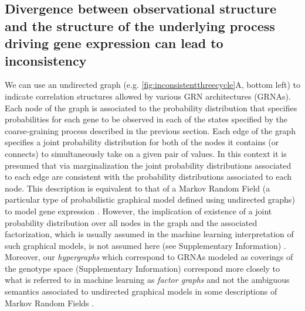 \subsection{Divergence between observational structure and the structure of the underlying process driving gene expression can lead to inconsistency}
We can use an undirected graph (e.g. \ref{fig:inconsistentthreecycle}A, bottom left) to indicate correlation structures allowed by various GRN architectures (GRNAs). Each node of the graph is associated to the probability distribution that specifies probabilities for each gene to be observed in each of the states specified by the coarse-graining process described in the previous section. Each edge of the graph specifies a joint probability distribution for both of the nodes it contains (or connects) to simultaneously take on a given pair of values. In this context it is presumed that via marginalization the joint probability distributions associated to each edge are consistent with the probability distributions associated to each node. This description is equivalent to that of a Markov Random Field (a particular type of probabilistic graphical model defined using undirected graphs) to model gene expression \cite{Chen2013a}. However, the implication of existence of a joint probability distribution over all nodes in the graph and the associated factorization, which is usually assumed in the machine learning interpretation of such graphical models, is not assumed here (see Supplementary Information) \cite{Barber2012,Bishop2007,Murphy2012,Koller2009}. Moreover, our \emph{hypergraphs} which correspond to GRNAs modeled as coverings of the genotype space (Supplementary Information) correspond more closely to what is referred to in machine learning as \emph{factor graphs} and not the ambiguous semantics associated to undirected graphical models in some descriptions of Markov Random Fields \cite{Barber2012,Bishop2007,Murphy2012,Koller2009}.

